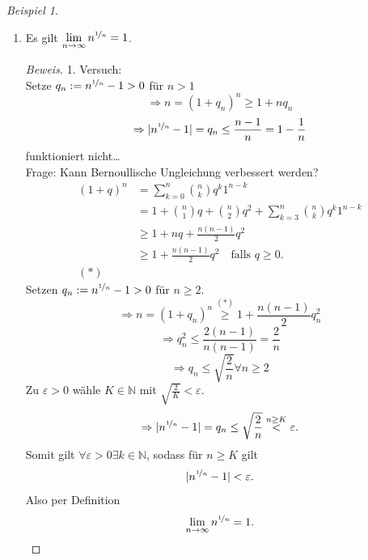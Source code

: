\documentclass[12pt,a4paper,titlepage]{article} %
\theoremstyle{definition}
\theoremstyle{remark}
\newtheorem*{bsp}{Beispiel}
\newenvironment{bew}{\begin{proof}[Beweis]}{\end{proof}}
\newcommand{\N}{\mathbb{N}}
\newcommand{\limes}[1]{\lim\limits_{#1\rightarrow\infty}}
\begin{document}
\begin{bsp}
\begin{enumerate}
\begin{bew}
			$a_n = a^{\frac{1}{n}} = 1+q_n \Rightarrow a = (1+q_n)^n \underset{\text{Bern. Ungl.}}{\geq} 1+ nq_n$
			$$\Rightarrow 0 \leq q_n \leq \frac{a-1}{n} \forall n\in\N$$
			Zu $\varepsilon > 0$ wähle $K\in\N$ mit $K>\frac{a-1}{\varepsilon}$.\\
			Dann $n\geq K$
			$$|a_n-1| = |a^{\nicefrac{1}{n}}-1|= a^{\nicefrac{1}{n}} -1 = q_n \leq \frac{a-1}{n} < \varepsilon.$$
			Fall 3: $0<a<1$. Dann ist $b := \frac{1}{a}>1$.			
			$$\overset{\text{Fall 2}}{\Rightarrow} \limes{n} b^{\frac{1}{n}} = 1$$
			\begin{align*}
				|a^{\nicefrac{1}{n}}-1|&=a^{\nicefrac{1}{n}}\left|1-\frac{a}{a^{\nicefrac{1}{n}}}\right|\\
				&= a^{\nicefrac{1}{n}}\left|1-\left(\frac{a}{a}\right)^{\nicefrac{1}{n}}\right|\\
				&= a^{\nicefrac{1}{n}} \left|1-b^{\nicefrac{1}{n}}\right|\\
				&\leq \left|1-b^{\nicefrac{1}{n}} \right|\underset{n\rightarrow\infty}{\longrightarrow} 0
			\end{align*}
			Somit gilt $$\limes{n} a^{\nicefrac{1}{n}} = 1$$
		\end{bew}
	\item Es gilt $\limes{n}n^{\nicefrac{1}{n}}=1$.
	\begin{bew}
		1. Versuch:\\
		Setze $q_n := n^{\nicefrac{1}{n}} -1>0$ für $n>1$\\
		$$\Rightarrow n=(1+q_n)^n \geq 1+nq_n$$
		$$\Rightarrow |n^{\nicefrac{1}{n}}-1| = q_n \leq \frac{n-1}{n} = 1-\frac{1}{n}$$
		funktioniert nicht\dots\\
		Frage: Kann Bernoullische Ungleichung verbessert werden?\\
		\begin{align*}
			(1+q)^n &= \sum_{k=0}^{n} \binom{n}{k} q^k1^{n-k}\\
			&=1+\binom{n}{1}q + \binom{n}{2}q^2 + \sum_{k=3}^{n}\binom{n}{k} q^k1^{n-k}\\
			&\geq 1+nq + \frac{n(n-1)}{2} q^2\\
			&\geq 1+\frac{n(n-1)}{2} q^2 \quad\text{falls }	q\geq 0.\\
			(*)
		\end{align*}
		Setzen $q_n := n^{\nicefrac{1}{n}} -1 >0$ für $n\geq 2$.
		$$\Rightarrow n = (1+q_n)^n \overset{(*)}{\geq}1+\frac{n(n-1)}{2} q_n^2$$
		$$\Rightarrow q_n^2 \leq \frac{2(n-1)}{n(n-1)} = \frac{2}{n}$$
		$$\Rightarrow q_n \leq \sqrt{\frac{2}{n}} \forall n\geq 2$$
		Zu $\varepsilon >0$ wähle $K\in\N$ mit $\sqrt{\frac{2}{K}}<\varepsilon$.
		$$\Rightarrow |n^{\nicefrac{1}{n}} -1| = q_n \leq \sqrt{\frac{2}{n}} \overset{n\geq K}{<} \varepsilon.$$
		Somit gilt $\forall\varepsilon>0\exists k\in\N$, sodass für $n\geq K$ gilt
		$$|n^{\nicefrac{1}{n}} - 1| <\varepsilon.$$
		Also per Definition
		$$\limes{n} n^{\nicefrac{1}{n}} = 1.$$
	\end{bew}
	\end{enumerate}
\end{bsp}
\end{document}
